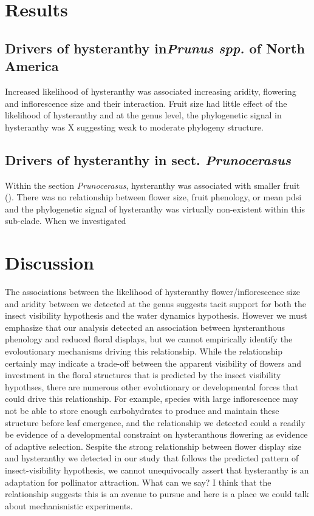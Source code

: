 \documentclass{article}\usepackage[]{graphicx}\usepackage[]{color}
\begin{document}
\section*{Results}
\subsection*{Drivers of hysteranthy in\textit{Prunus spp.} of North America}
Increased likelihood of hysteranthy was associated increasing aridity, flowering and inflorescence size and their interaction. Fruit size had little effect of the likelihood of hysteranthy and at the genus level, the phylogenetic signal in hysteranthy was X suggesting weak to moderate phylogeny structure.


\subsection*{Drivers of hysteranthy in sect. \textit{Prunocerasus} }
Within the section \textit{Prunocerasus}, hysteranthy was associated with smaller fruit (). There was no relationship between flower size, fruit phenology, or mean pdsi and the phylogenetic signal of hysteranthy was virtually non-existent within this sub-clade. When we investigated

\section*{Discussion}
The associations between the likelihood of hysteranthy flower/inflorescence size and aridity between we detected at the genus suggests tacit support for both the insect visibility hypothesis and the water dynamics hypothesis. However we must emphasize that our analysis detected an association between hysteranthous phenology and reduced floral displays, but we cannot empirically identify the evoloutionary mechanisms driving this relationship. While the relationship certainly may indicate a trade-off between the apparent visibility of flowers and investment in the floral structures that is predicted by the insect visibility hypothses, there are numerous other evolutionary or developmental forces that could drive this relationship. For example, species with large inflorescence may not be able to store enough carbohydrates to produce and maintain these structure before leaf emergence, and the relationship we detected could a readily be evidence of a developmental constraint on hysteranthous flowering as evidence of adaptive selection.  Sespite the strong relationship between flower display size and hysteranthy we detected in our study that follows the predicted pattern of insect-visibility hypothesis, we cannot unequivocally assert that hysteranthy is an adaptation for pollinator attraction. What can we say? I think that the relationship suggests this is an avenue to pursue and here is a place we could talk about mechanisnistic experiments.
\end{document}
